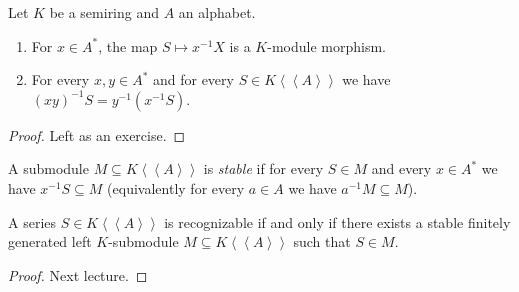 \begin{lemma}
    Let $K$ be a semiring and $A$ an alphabet.
    \begin{enumerate}[(1)]
        \item For $x \in A^*$, the map $S \mapsto x^{-1}X$ is a $K$-module 
        morphism.
        \item For every $x,y \in A^*$ and for every $S \in K \left<\left<A\right>\right>$
        we have $(xy)^{-1}S = y^{-1}(x^{-1}S)$.
    \end{enumerate}
\end{lemma}

\begin{proof}
    Left as an exercise.
\end{proof}

\begin{definition}
    A submodule $M \subseteq K \left<\left<A\right>\right>$ is \emph{stable} 
    if for every $S \in M$ and every $x \in A^*$ we have $x^{-1}S \subseteq M$ (equivalently
    for every $a \in A$ we have $a^{-1}M \subseteq M$).
\end{definition}

\begin{theorem}
    A series $S \in K \left<\left<A\right>\right>$ is recognizable if and only 
    if there exists a stable finitely generated left $K$-submodule $M \subseteq 
    K \left<\left<A\right>\right>$ such that $S \in M$.
\end{theorem}
\begin{proof}
    Next lecture.
\end{proof}
